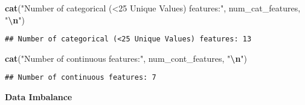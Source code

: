 \documentclass[
]{article}
\newenvironment{Shaded}{\begin{snugshade}}{\end{snugshade}}
\newcommand{\FunctionTok}[1]{\textcolor[rgb]{0.13,0.29,0.53}{\textbf{#1}}}
\newcommand{\NormalTok}[1]{#1}
\newcommand{\SpecialCharTok}[1]{\textcolor[rgb]{0.81,0.36,0.00}{\textbf{#1}}}
\newcommand{\StringTok}[1]{\textcolor[rgb]{0.31,0.60,0.02}{#1}}
\begin{document}
\begin{Shaded}
\begin{Highlighting}[]
\FunctionTok{cat}\NormalTok{(}\StringTok{"Number of categorical (\textless{}25 Unique Values) features:"}\NormalTok{, num\_cat\_features, }\StringTok{"}\SpecialCharTok{\textbackslash{}n}\StringTok{"}\NormalTok{)}
\end{Highlighting}
\end{Shaded}

\begin{verbatim}
## Number of categorical (<25 Unique Values) features: 13
\end{verbatim}

\begin{Shaded}
\begin{Highlighting}[]
\FunctionTok{cat}\NormalTok{(}\StringTok{"Number of continuous features:"}\NormalTok{, num\_cont\_features, }\StringTok{"}\SpecialCharTok{\textbackslash{}n}\StringTok{"}\NormalTok{)}
\end{Highlighting}
\end{Shaded}

\begin{verbatim}
## Number of continuous features: 7
\end{verbatim}

\textbf{Data Imbalance}
\end{document}
